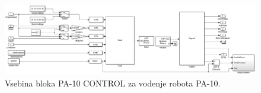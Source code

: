 \begin{figure}[!h]
	\centering
	\includegraphics[scale=0.2]{./Slike/simulink-pa-10-inside.png}
	\caption{Vsebina \simulink bloka PA-10 CONTROL za vodenje robota PA-10.}
	\label{fig:simulink-pa-10-inside}
\end{figure}
